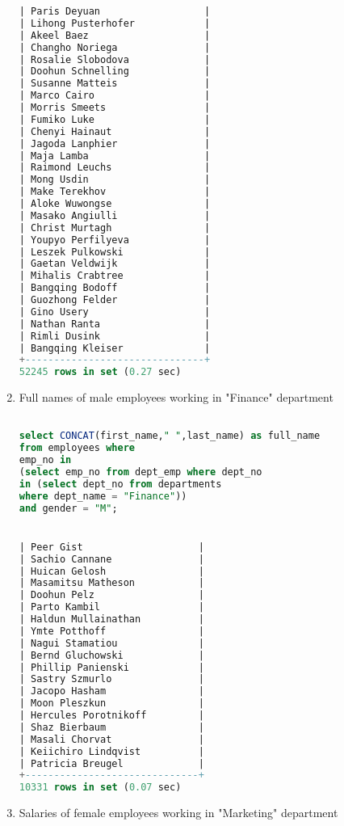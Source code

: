 \documentclass[12pt, letterpaper, twoside]{article}
\begin{document}
\begin{enumerate}
\begin{lstlisting}[language=SQL]
| Paris Deyuan                  |
| Lihong Pusterhofer            |
| Akeel Baez                    |
| Changho Noriega               |
| Rosalie Slobodova             |
| Doohun Schnelling             |
| Susanne Matteis               |
| Marco Cairo                   |
| Morris Smeets                 |
| Fumiko Luke                   |
| Chenyi Hainaut                |
| Jagoda Lanphier               |
| Maja Lamba                    |
| Raimond Leuchs                |
| Mong Usdin                    |
| Make Terekhov                 |
| Aloke Wuwongse                |
| Masako Angiulli               |
| Christ Murtagh                |
| Youpyo Perfilyeva             |
| Leszek Pulkowski              |
| Gaetan Veldwijk               |
| Mihalis Crabtree              |
| Bangqing Bodoff               |
| Guozhong Felder               |
| Gino Usery                    |
| Nathan Ranta                  |
| Rimli Dusink                  |
| Bangqing Kleiser              |
+-------------------------------+
52245 rows in set (0.27 sec)


\end{lstlisting}

\item Full names of male employees working in "Finance" department
\begin{lstlisting}[language=SQL]

select CONCAT(first_name," ",last_name) as full_name 
from employees where
emp_no in
(select emp_no from dept_emp where dept_no 
in (select dept_no from departments 
where dept_name = "Finance")) 
and gender = "M";


| Peer Gist                    |
| Sachio Cannane               |
| Huican Gelosh                |
| Masamitsu Matheson           |
| Doohun Pelz                  |
| Parto Kambil                 |
| Haldun Mullainathan          |
| Ymte Potthoff                |
| Nagui Stamatiou              |
| Bernd Gluchowski             |
| Phillip Panienski            |
| Sastry Szmurlo               |
| Jacopo Hasham                |
| Moon Pleszkun                |
| Hercules Porotnikoff         |
| Shaz Bierbaum                |
| Masali Chorvat               |
| Keiichiro Lindqvist          |
| Patricia Breugel             |
+------------------------------+
10331 rows in set (0.07 sec)


\end{lstlisting}

\item Salaries of female employees working in "Marketing" department
\begin{lstlisting}[language=SQL]


\end{lstlisting}
\end{enumerate}
\end{document}

